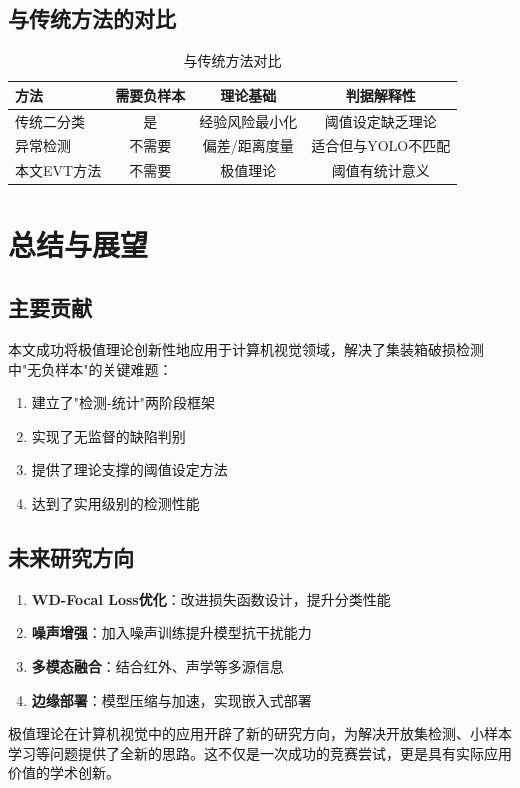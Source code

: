 \documentclass[12pt,a4paper]{ctexart}
\theoremstyle{cumcm}
\begin{document}
\subsection{与传统方法的对比}

\begin{table}[H]
\centering
{}
\caption{与传统方法对比}
\begin{tabular}{lccc}
\toprule
\textbf{方法} & \textbf{需要负样本} & \textbf{理论基础} & \textbf{判据解释性} \\
\midrule
传统二分类 & 是 & 经验风险最小化 & 阈值设定缺乏理论 \\
异常检测 & 不需要 & 偏差/距离度量 & 适合但与YOLO不匹配 \\
本文EVT方法 & 不需要 & 极值理论 & 阈值有统计意义 \\
\bottomrule
\end{tabular}
\end{table}

\section{总结与展望}

\subsection{主要贡献}

本文成功将极值理论创新性地应用于计算机视觉领域，解决了集装箱破损检测中"无负样本"的关键难题：

\begin{enumerate}[leftmargin=2.2em,itemsep=2pt]
\item 建立了"检测-统计"两阶段框架
\item 实现了无监督的缺陷判别
\item 提供了理论支撑的阈值设定方法
\item 达到了实用级别的检测性能
\end{enumerate}

\subsection{未来研究方向}

\begin{enumerate}[leftmargin=2.2em,itemsep=2pt]
\item \textbf{WD-Focal Loss优化}：改进损失函数设计，提升分类性能
\item \textbf{噪声增强}：加入噪声训练提升模型抗干扰能力
\item \textbf{多模态融合}：结合红外、声学等多源信息
\item \textbf{边缘部署}：模型压缩与加速，实现嵌入式部署
\end{enumerate}

极值理论在计算机视觉中的应用开辟了新的研究方向，为解决开放集检测、小样本学习等问题提供了全新的思路。这不仅是一次成功的竞赛尝试，更是具有实际应用价值的学术创新。
\end{document}
